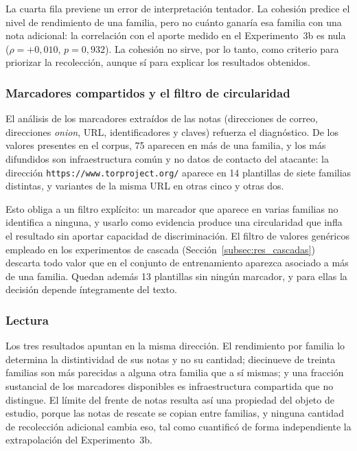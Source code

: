 La cuarta fila previene un error de interpretación tentador. La cohesión predice el nivel de rendimiento de una familia, pero no cuánto ganaría esa familia con una nota adicional: la correlación con el aporte medido en el Experimento~3b es nula ($\rho = +0{,}010$, $p = 0{,}932$). La cohesión no sirve, por lo tanto, como criterio para priorizar la recolección, aunque sí para explicar los resultados obtenidos.

\subsubsection*{Marcadores compartidos y el filtro de circularidad}

El análisis de los marcadores extraídos de las notas (direcciones de correo, direcciones \textit{onion}, URL, identificadores y claves) refuerza el diagnóstico. De los valores presentes en el corpus, 75 aparecen en más de una familia, y los más difundidos son infraestructura común y no datos de contacto del atacante: la dirección \texttt{https://www.torproject.org/} aparece en 14 plantillas de siete familias distintas, y variantes de la misma URL en otras cinco y otras dos.

Esto obliga a un filtro explícito: un marcador que aparece en varias familias no identifica a ninguna, y usarlo como evidencia produce una circularidad que infla el resultado sin aportar capacidad de discriminación. El filtro de valores genéricos empleado en los experimentos de cascada (Sección~\ref{subsec:res_cascadas}) descarta todo valor que en el conjunto de entrenamiento aparezca asociado a más de una familia. Quedan además 13 plantillas sin ningún marcador, y para ellas la decisión depende íntegramente del texto.

\subsubsection*{Lectura}

Los tres resultados apuntan en la misma dirección. El rendimiento por familia lo determina la distintividad de sus notas y no su cantidad; diecinueve de treinta familias son más parecidas a alguna otra familia que a sí mismas; y una fracción sustancial de los marcadores disponibles es infraestructura compartida que no distingue. El límite del frente de notas resulta así una propiedad del objeto de estudio, porque las notas de rescate se copian entre familias, y ninguna cantidad de recolección adicional cambia eso, tal como cuantificó de forma independiente la extrapolación del Experimento~3b.


